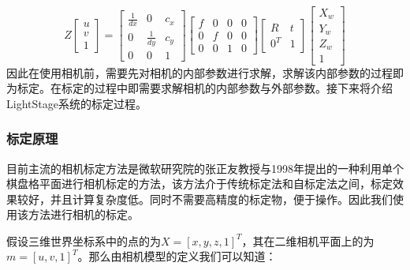 \begin{equation}
    Z\left[\begin{array}{c}u\\v\\1\end{array}\right] =
    \left[\begin{array}{ccc}\frac{1}{dx}&0&c_x\\0&\frac{1}{dy}&c_y\\0&0&1\end{array}\right]
    \left[\begin{array}{cccc}f&0&0&0\\0&f&0&0\\0&0&1&0\end{array}\right]
    \left[\begin{array}{cc}R&t\\0^T&1\end{array}\right]
    \left[\begin{array}{c}X_w\\Y_w\\Z_w\\1\end{array}\right]
\end{equation}
因此在使用相机前，需要先对相机的内部参数进行求解，求解该内部参数的过程即为标定。在标定的过程中即需要求解相机的内部参数与外部参数。接下来将介绍LightStage系统的标定过程。

\subsubsection{标定原理}

目前主流的相机标定方法是微软研究院的张正友教授与1998年提出的一种利用单个棋盘格平面进行相机标定的方法，该方法介于传统标定法和自标定法之间，标定效果较好，并且计算复杂度低。同时不需要高精度的标定物，便于操作。因此我们使用该方法进行相机的标定。



假设三维世界坐标系中的点的\qczb 为\(X = [x,y,z,1]^T\)，其在二维相机平面上的\qczb 为\(m = [u,v,1]^T\)。那么由相机模型的定义我们可以知道：

